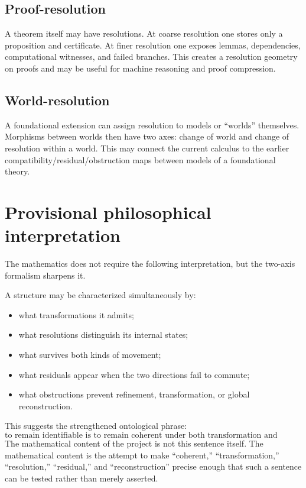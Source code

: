 \documentclass[11pt]{article}
\theoremstyle{definition}
\theoremstyle{remark}
\begin{document}
\subsection{Proof-resolution}
A theorem itself may have resolutions. At coarse resolution one stores only a proposition and certificate. At finer resolution one exposes lemmas, dependencies, computational witnesses, and failed branches. This creates a resolution geometry on proofs and may be useful for machine reasoning and proof compression.

\subsection{World-resolution}
A foundational extension can assign resolution to models or ``worlds'' themselves. Morphisms between worlds then have two axes: change of world and change of resolution within a world. This may connect the current calculus to the earlier compatibility/residual/obstruction maps between models of a foundational theory.

\section{Provisional philosophical interpretation}

The mathematics does not require the following interpretation, but the two-axis formalism sharpens it.

A structure may be characterized simultaneously by:
\begin{itemize}
    \item what transformations it admits;
    \item what resolutions distinguish its internal states;
    \item what survives both kinds of movement;
    \item what residuals appear when the two directions fail to commute;
    \item what obstructions prevent refinement, transformation, or global reconstruction.
\end{itemize}

This suggests the strengthened ontological phrase:
\[
\boxed{
\text{to remain identifiable is to remain coherent under both transformation and resolution.}
}
\]
The mathematical content of the project is not this sentence itself. The mathematical content is the attempt to make ``coherent,'' ``transformation,'' ``resolution,'' ``residual,'' and ``reconstruction'' precise enough that such a sentence can be tested rather than merely asserted.
\end{document}
